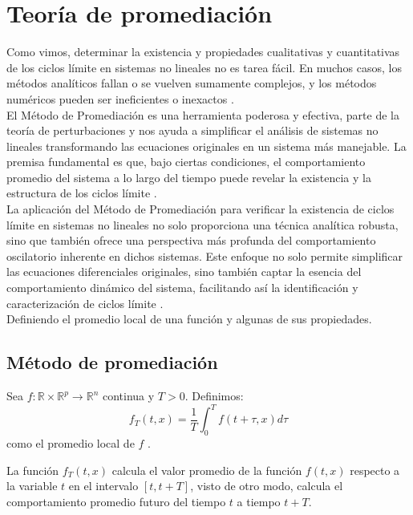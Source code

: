 \chapter{Teoría de promediación}

Como vimos, determinar la existencia y propiedades cualitativas y cuantitativas
de los ciclos límite en sistemas no lineales no es tarea fácil. En muchos
casos, los métodos analíticos fallan o se vuelven sumamente complejos, y los
métodos numéricos pueden ser ineficientes o inexactos \cite{guckenheimer1983nonlinear}. \\

El Método de Promediación es una herramienta poderosa y efectiva,
parte de la teoría de perturbaciones y nos ayuda a simplificar el análisis
de sistemas no lineales transformando las ecuaciones originales en un sistema
más manejable. La premisa fundamental es que, bajo ciertas condiciones, el
comportamiento promedio del sistema a lo largo del tiempo puede revelar
la existencia y la estructura de los ciclos límite \cite{hinch1991perturbation}.\\

La aplicación del Método de Promediación para verificar la existencia de
ciclos límite en sistemas no lineales no solo proporciona una técnica
analítica robusta, sino que también ofrece una perspectiva más profunda
del comportamiento oscilatorio inherente en dichos sistemas. Este enfoque
no solo permite simplificar las ecuaciones diferenciales originales, sino
también captar la esencia del comportamiento dinámico del sistema,
facilitando así la identificación y caracterización de ciclos límite \cite{bender2013advanced}.\\

Definiendo el promedio local de una función y algunas de sus propiedades.

\section{Método de promediación}

\begin{definition}
	Sea $f:\mathbb{R}\times\mathbb{R}^p\to\mathbb{R}^n$ continua y $T>0$.
	Definimos:
	\[ 
		f_T(t,x)=\frac{1}{T}\int_{0}^{T}f(t+\tau,x)d\tau
	\]
	como el promedio local de $f$ \cite{hinch1991perturbation}.
\end{definition}

La función $f_T(t,x)$ calcula el valor promedio de la función $f(t,x)$ 
respecto a la variable $t$ en el intervalo $[t,t+T]$, visto de otro 
modo, calcula el comportamiento promedio futuro del tiempo $t$ a tiempo $t+T$.\\

